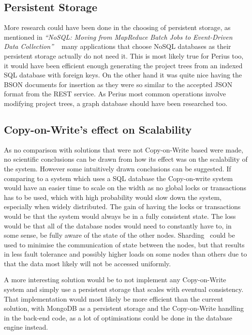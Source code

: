 \documentclass[a4paper,12pt]{article}
\begin{document}
\subsection{Persistent Storage}
More research could have been done in the choosing of persistent storage, as mentioned in 
\textit{``NoSQL: Moving from MapReduce Batch Jobs to Event-Driven Data Collection''}
~\cite{KLINGSBO} many applications that choose NoSQL databases as their persistent storage 
actually do not need it. This is most likely true for Perius too, it would have been efficient 
enough generating the project trees from an indexed SQL database with foreign keys. On the 
other hand it was quite nice having the BSON documents for insertion as they were so similar 
to the accepted JSON format from the REST service. As Perius most common operations involve 
modifying project trees, a graph database should have been researched too.

\subsection{Copy-on-Write's effect on Scalability}
As no comparison with solutions that were not Copy-on-Write based were made, no scientific
conclusions can be drawn from how its effect was on the scalability of the system. However some
intuitively drawn conclusions can be suggested. If comparing to a system which uses a SQL database
the Copy-on-write system would have an easier time to scale on the width as no global locks or
transactions has to be used, which with high probability would slow down the system, especially when
widely distributed.
The gain of having the locks or transactions would be that the system would
always be in a fully consistent state. The loss would be that all of the database nodes would need
to constantly have to, in some sense, be fully aware of the state of the other nodes.
Sharding~\cite{SHARDING} could be used to minimise the communication of state between the nodes, but
that results in less fault tolerance and possibly higher loads on some nodes than others due to that
the data most likely will not be accessed uniformly.

\par A more interesting solution would be to not implement any Copy-on-Write system and simply use 
a persistent storage that scales with eventual consistency. That implementation would most likely be
more efficient than the current solution, with MongoDB as a persistent storage and the Copy-on-Write
handling in the back-end code, as a lot of optimisations could be done in the database engine
instead.
\end{document}

